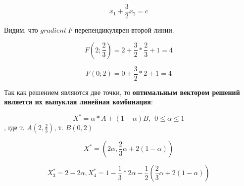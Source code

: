 \documentclass{article}
\begin{document}
$$x_1 + \frac{3}{2}x_2 = c$$

Видим, что $gradient \ F$ перепендикулярен второй линии.

$$
F(2; \frac{2}{3}) = 2 + \frac{3}{2} * \frac{2}{3} + 1 = 4
$$

$$
F(0; 2) = 0 + \frac{3}{2} * 2 + 1 = 4
$$

Так как решением являются две точки, то \textbf{оптимальным вектором решений является их выпуклая линейная комбинация}:

$$
X^{*} = \alpha * A + (1 - \alpha) B, \ \ 0 \le \alpha \le 1
$$, где т. $A(2, \frac{2}{3})$, т. $B(0, 2)$

$$X^{*} = (2\alpha, \frac{2}{3}\alpha + 2(1 - \alpha))$$

$$
X_3^{*} = 2 - 2\alpha, X_{4}^{*} = 1 - \frac{1}{3} * 2\alpha - \frac{1}{2}(\frac{2}{3}\alpha + 2(1 - \alpha))
$$
\end{document}
